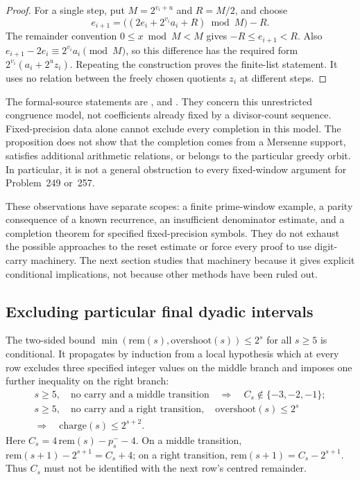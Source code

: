 \begin{proof}
For a single step, put $M=2^{v_i+u}$ and $R=M/2$, and choose
\[
 e_{i+1}=\bigl((2e_i+2^{v_i}a_i+R)\bmod M\bigr)-R.
\]
The remainder convention $0\le x\bmod M<M$ gives
$-R\le e_{i+1}<R$.  Also
$e_{i+1}-2e_i\equiv2^{v_i}a_i\pmod M$, so this difference has
the required form $2^{v_i}(a_i+2^u z_i)$.  Repeating the
construction proves the finite-list statement.  It uses no
relation between the freely chosen quotients $z_i$ at different
steps.
\end{proof}

The formal-source statements are
,
and
.
They concern this unrestricted congruence model, not coefficients
already fixed by a divisor-count sequence.  Fixed-precision data
alone cannot exclude every completion in this model.  The proposition
does not show that the completion comes from a Mersenne support,
satisfies additional arithmetic relations, or belongs to the
particular greedy orbit.  In particular, it is not a general
obstruction to every fixed-window argument for Problem~249 or~257.

These observations have separate scopes: a finite prime-window
example, a parity consequence of a known recurrence, an insufficient
denominator estimate, and a completion theorem for specified
fixed-precision symbols.  They do not exhaust the possible approaches
to the reset estimate or force every proof to use digit-carry
machinery.  The next section studies that machinery because it gives
explicit conditional implications, not because other methods have
been ruled out.

\subsection{Excluding particular final dyadic intervals}
\label{sec:branch-exclusions}

The two-sided bound
$\min(\mathrm{rem}(s),\mathrm{overshoot}(s))\le2^s$ for all $s\ge5$
is conditional.  It propagates by induction from a local hypothesis which at every row
excludes three specified integer values on the middle branch and imposes
one further inequality on the right branch:
\[
 \begin{gathered}
 s\ge5,\quad\text{no carry and a middle transition}
 \quad\Longrightarrow\quad C_s\notin\{-3,-2,-1\};\\
 s\ge5,\quad\text{no carry and a right transition},\quad
 \mathrm{overshoot}(s)\le2^s\\
 \Longrightarrow\quad\mathrm{charge}(s)\le2^{s+2}.
 \end{gathered}
\]
Here $C_s=4\,\mathrm{rem}(s)-p_s^- -4$.  On a middle transition,
$\mathrm{rem}(s+1)-2^{s+1}=C_s+4$; on a right transition,
$\mathrm{rem}(s+1)=C_s-2^{s+1}$.  Thus $C_s$ must not be identified
with the next row's centred remainder.

